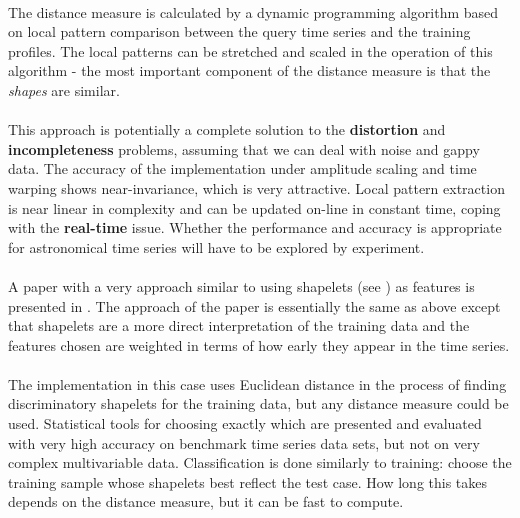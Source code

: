 	\paragraph{}
	The distance measure is calculated by a dynamic programming algorithm based on local pattern comparison between the query time series and the training profiles. The local patterns can be stretched and scaled in the operation of this algorithm - the most important component of the distance measure is that the \emph{shapes} are similar.
	\paragraph{}
	This approach is potentially a complete solution to the \textbf{distortion} and \textbf{incompleteness} problems, assuming that we can deal with noise and gappy data. The accuracy of the implementation under amplitude scaling and time warping shows near-invariance, which is very attractive. Local pattern extraction is near linear in complexity and can be updated on-line in constant time, coping with the \textbf{real-time} issue. Whether the performance and accuracy is appropriate for astronomical time series will have to be explored by experiment. 	
	\paragraph{}
	A paper with a very approach similar to \citep{chen2007spade} using shapelets (see \citep{ye2009time}) as features is presented in \citep{xing2011extracting}. The approach of the paper is essentially the same as above except that shapelets are a more direct interpretation of the training data and the features chosen are weighted in terms of how early they appear in the time series. 
	\paragraph{}
	The implementation in this case uses Euclidean distance in the process of finding discriminatory shapelets for the training data, but any distance measure could be used. Statistical tools for choosing exactly which are presented and evaluated with very high accuracy on benchmark time series data sets, but not on very complex multivariable data. Classification is done similarly to training: choose the training sample whose shapelets best reflect the test case. How long this takes depends on the distance measure, but it can be fast to compute.
	
